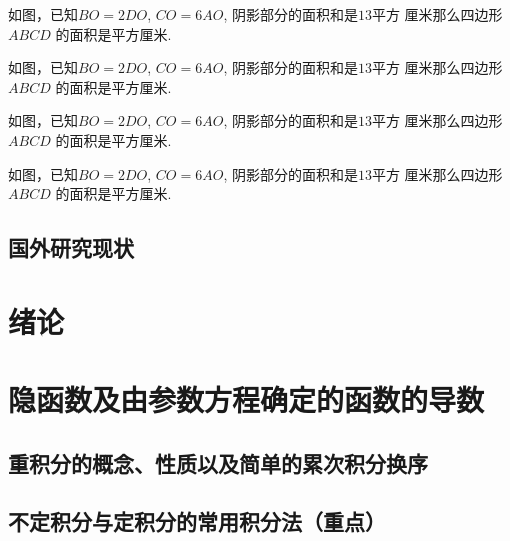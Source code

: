 \documentclass{USTBBook}
\begin{document}
\begin{question*}
  如图，已知$BO=2DO$, $CO=6AO$, 阴影部分的面积和是$13$平方
  厘米那么四边形 $ABCD$ 的面积是\fillin[]平方厘米.
\end{question*}

\begin{question*}
  如图，已知$BO=2DO$, $CO=6AO$, 阴影部分的面积和是$13$平方
  厘米那么四边形 $ABCD$ 的面积是\fillin[]平方厘米.
\end{question*}

\begin{question*}
  如图，已知$BO=2DO$, $CO=6AO$, 阴影部分的面积和是$13$平方
  厘米那么四边形 $ABCD$ 的面积是\fillin[]平方厘米.
\end{question*}

\begin{question*}
  如图，已知$BO=2DO$, $CO=6AO$, 阴影部分的面积和是$13$平方
  厘米那么四边形 $ABCD$ 的面积是\fillin[]平方厘米.
\end{question*}

\newpage
\section*{国外研究现状}

\subsection{}
\zhlipsum[4]

\subsection{}
\zhlipsum[5]

\chapter{绪论}
\zhlipsum[1]

\chapter{隐函数及由参数方程确定的函数的导数}
\zhlipsum[6]

\cleardoublepage
\section{重积分的概念、性质以及简单的累次积分换序}
\zhlipsum[7]

\cleardoublepage
\section{不定积分与定积分的常用积分法（重点）}
\zhlipsum[8]
\end{document}
